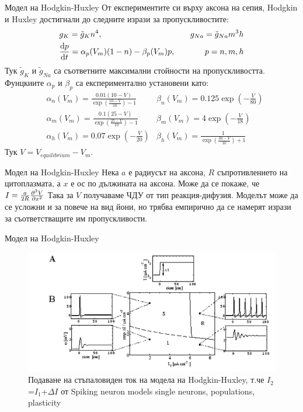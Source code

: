\begin{frame}[t]{Модел на Hodgkin-Huxley}
  От експериментите си върху аксона на сепия, Hodgkin и Huxley достигнали до следните изрази за пропускливостите:
  \begin{align*}
    &g_{K}=\tilde{g}_{K}n^4,\quad &g_{Na}=\tilde{g}_{Na}m^3h \\
    &\dv{p}{t}=\alpha_p(V_m)(1-n)-\beta_p(V_m)p,\quad &p={n,m,h}
  \end{align*}
  Тук $\tilde{g}_{K}$ и $\tilde{g}_{Na}$ са съответните максимални стойности на пропускливостта.
  Фунцкиите $\alpha_p$ и $\beta_p$ са експериментално установени като: 
  \begin{align*}
    &\alpha_{n}(V_{m})={\frac{0.01(10-V)}{\exp\left({\frac{10-V}{10}}\right)-1}} &\beta_{n}(V_{m})=0.125\exp\left(-\frac{V}{80}\right)\\
    &\alpha_{m}(V_{m})={\frac{0.1(25-V)}{\exp\left({\frac{25-V}{10}}\right)-1}} &\beta_{m}(V_{m})=4\exp\left(-\frac{V}{18}\right)\\
    &\alpha_{h}(V_{m})=0.07\exp\left(-{\frac{V}{20}}\right) &\beta_{h}(V_{m})={\frac{1}{\exp\left({\frac{30-V}{10}}\right)+1}}  
  \end{align*}
  Тук $V = V_{equilibrium} - V_m$.
\end{frame}

\begin{frame}[t]{Модел на Hodgkin-Huxley}
  Нека $a$ е радиусът на аксона, $R$ съпротивлението на цитоплазмата, а $x$ е ос по дължината на аксона.
  Може да се покаже, че $I={\frac{a}{2R}}\pdv[2]{V}{x}$
  Така за $V$ получаваме ЧДУ от тип реакция-дифузия.
  Моделът може да се усложни и за повече на вид йони, но трябва емпирично да се намерят изрази за съответстващите им пропускливости.
\end{frame}

\begin{frame}[t]{Модел на Hodgkin-Huxley}
  \begin{figure}[htbp!]
      \centering
      \includegraphics[width=\textwidth,height=0.7\textheight,keepaspectratio]{hodgkin-huxley-response.PNG}
      \caption{Подаване на стъпаловиден ток на модела на Hodgkin-Huxley, т.че $I_2$=$I_1$+$\Delta I$ от Spiking neuron models single neurons, populations, plasticity}
  \end{figure}
\end{frame}

